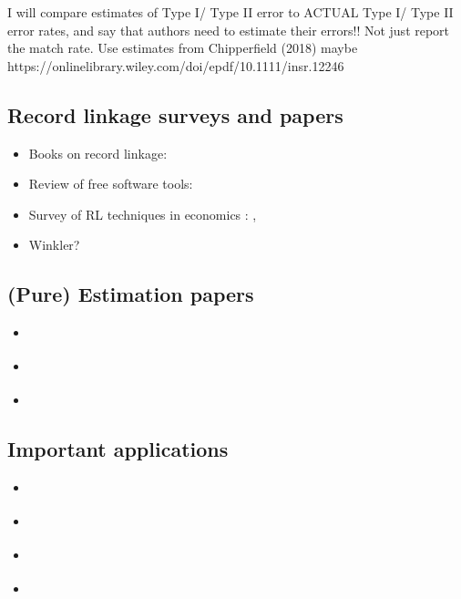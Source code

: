 \documentclass[12pt]{article}
\begin{document}
I will compare estimates of Type I/ Type II error to ACTUAL Type I/ Type II error rates, and say that authors need to estimate their errors!! Not just report the match rate.   Use estimates from Chipperfield (2018) maybe https://onlinelibrary.wiley.com/doi/epdf/10.1111/insr.12246

\newpage

\subsection*{Record linkage surveys and papers}
\begin{itemize}
\item Books on record linkage: \cite{christen2012, herzog07}
\item Review of free software tools: \cite{kopcke2010}
\item Survey of RL techniques in economics : \cite{bailey2017}, \cite{abe2019} 
\item Winkler? 
\end{itemize}

\subsection*{(Pure) Estimation papers}
\begin{itemize}
\item \cite{sw2017}
\item \cite{lahiri05}
\item \cite{ahl2019}
\end{itemize}

\subsection*{Important applications}
\begin{itemize}
\item \cite{ferrie96}
\item \cite{abe2012, abe2014, abe2017}
\item \cite{nq2015}
\item \cite{bleakley2016}
\end{itemize}

 

\end{document}
